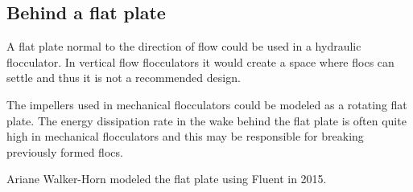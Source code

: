 \documentclass[letterpaper,10pt,english]{sphinxmanual}
\begin{document}
\subsection{Behind a flat plate}
\label{\detokenize{Rapid_Mix/RM_Derivations:behind-a-flat-plate}}\label{\detokenize{Rapid_Mix/RM_Derivations:heading-behind-a-flat-plate}}
A flat plate normal to the direction of flow could be used in a hydraulic flocculator. In vertical flow flocculators it would create a space where flocs can settle and thus it is not a recommended design.

The impellers used in mechanical flocculators could be modeled as a rotating flat plate. The energy dissipation rate in the wake behind the flat plate is often quite high in mechanical flocculators and this may be responsible for breaking previously formed flocs.

Ariane Walker-Horn modeled the flat plate using Fluent in 2015.
\end{document}
